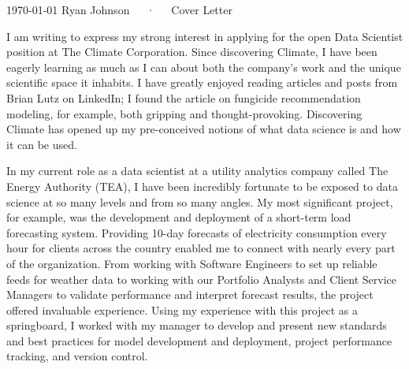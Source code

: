 \documentclass[14pt, a4paper]{./shared/awesome-cv}
\begin{document}
\makecvheader[R]

\makecvfooter
  {\today}
  {}
  {Ryan Johnson~~~·~~~Cover Letter}

\makelettertitle

\begin{cvletter}


I am writing to express my strong interest in applying for the open Data Scientist position at The Climate Corporation. Since discovering Climate, I have been eagerly learning as much as I can about both the company's work and the unique scientific space it inhabits. I have greatly enjoyed reading articles and posts from Brian Lutz on LinkedIn; I found the article on fungicide recommendation modeling, for example, both gripping and thought-provoking. Discovering Climate has opened up my pre-conceived notions of what data science is and how it can be used. 

In my current role as a data scientist at a utility analytics company called The Energy Authority (TEA), I have been incredibly fortunate to be exposed to data science at so many levels and from so many angles. My most significant project, for example, was the development and deployment of a short-term load forecasting system. Providing 10-day forecasts of electricity consumption every hour for clients across the country enabled me to connect with nearly every part of the organization. From working with Software Engineers to set up reliable feeds for weather data to working with our Portfolio Analysts and Client Service Managers to validate performance and interpret forecast results, the project offered invaluable experience. Using my experience with this project as a springboard, I worked with my manager to develop and present new standards and best practices for model development and deployment, project performance tracking, and version control. 


\end{cvletter}
\end{document}
